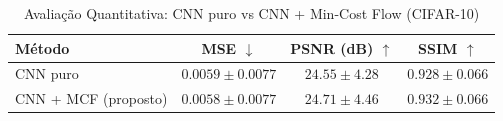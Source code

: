 \begin{table}[h]
\centering
\caption{Avaliação Quantitativa: CNN puro vs CNN + Min-Cost Flow (CIFAR-10)}
\label{tab:metrics}
\begin{tabular}{lccc}
\hline
Método & MSE $\downarrow$ & PSNR (dB) $\uparrow$ & SSIM $\uparrow$ \\
\hline
CNN puro & $0.0059 \pm 0.0077$ & $24.55 \pm 4.28$ & $0.928 \pm 0.066$ \\
CNN + MCF (proposto) & $0.0058 \pm 0.0077$ & $24.71 \pm 4.46$ & $0.932 \pm 0.066$ \\
\hline
\end{tabular}
\end{table}